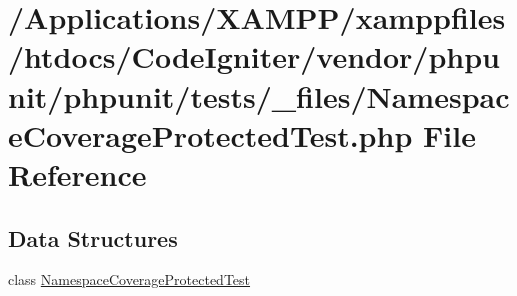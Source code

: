 \hypertarget{phpunit_2tests_2__files_2_namespace_coverage_protected_test_8php}{}\section{/\+Applications/\+X\+A\+M\+P\+P/xamppfiles/htdocs/\+Code\+Igniter/vendor/phpunit/phpunit/tests/\+\_\+files/\+Namespace\+Coverage\+Protected\+Test.php File Reference}
\label{phpunit_2tests_2__files_2_namespace_coverage_protected_test_8php}
\subsection*{Data Structures}
\begin{DoxyCompactItemize}
\item 
class \mbox{\hyperlink{class_namespace_coverage_protected_test}{Namespace\+Coverage\+Protected\+Test}}
\end{DoxyCompactItemize}
